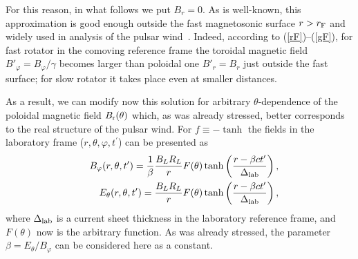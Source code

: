\documentclass[useAMS,usenatbib]{mn2e}
\def\vph{\varphi}
\def\th{\theta}
\def\b{B_{L \rm} R_{L \rm}}
\def\td{\tanh\left(\frac{r-\beta c t'}{\Delta_{\rm lab}}\right)}
\begin{document}
For this reason, in what follows we put $B_r = 0$. As is well-known, this approximation is 
good enough outside the fast magnetosonic surface $r > r_{\rm F}$ and widely used in analysis 
of the pulsar wind~\citep{2001ApJ...547..437L, 2014PhRvD..89j3013B}. Indeed, according to 
(\ref{rF})--(\ref{gF}), for fast rotator in the comoving reference frame the toroidal 
magnetic field $B'_{\varphi} = B_{\varphi}/\gamma$ becomes larger than poloidal one 
$B'_{r} = B_{r}$ just outside the fast surface; for slow rotator it takes place even 
at smaller distances. 

As a result, we can modify now this solution for arbitrary
$\theta$-dependence of the poloidal magnetic field $B_{\rm r}(\theta)$ which, as was 
already stressed, better corresponds to the real structure of the pulsar wind.
For $f\equiv - \tanh$ the fields in the laboratory frame 
($r, \theta, \varphi, t^{\prime}$) can be presented as
\begin{eqnarray}
&&B_\vph (r, \theta, t') = \frac{1}{\beta} \frac{\b}{r} F(\theta) \td,
\label{F1}\\
&&E_\th (r, \theta, t') = \frac{\b}{r} F(\theta) \td\label{F2},
\end{eqnarray}
where $\Delta_{\rm lab}$ is a current sheet thickness in the laboratory reference frame, 
and $F(\theta)$ now is the arbitrary function. As was already stressed, the parameter 
$\beta = E_{\theta}/B_{\varphi}$ can be considered here as a constant.

\end{document}
